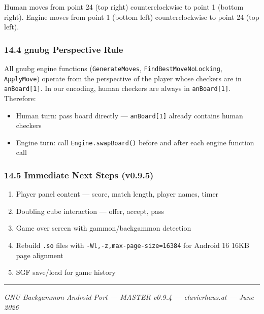 \documentclass[11pt,a4paper]{article}
\providecommand{\tightlist}{\setlength{\itemsep}{2pt}\setlength{\parskip}{0pt}}
\begin{document}
Human moves from point 24 (top right) counterclockwise to point 1
(bottom right). Engine moves from point 1 (bottom left) counterclockwise
to point 24 (top left).

\subsubsection{14.4 gnubg Perspective
Rule}\label{gnubg-perspective-v094}

All gnubg engine functions (\texttt{GenerateMoves},
\texttt{FindBestMoveNoLocking}, \texttt{ApplyMove}) operate from the
perspective of the player whose checkers are in \texttt{anBoard[1]}.
In our encoding, human checkers are always in \texttt{anBoard[1]}.
Therefore:

\begin{itemize}
\tightlist
\item
  Human turn: pass board directly — \texttt{anBoard[1]} already contains
  human checkers
\item
  Engine turn: call \texttt{Engine.swapBoard()} before and after each
  engine function call
\end{itemize}

\subsubsection{14.5 Immediate Next Steps
(v0.9.5)}\label{immediate-next-steps-v095}

\begin{enumerate}
\def\labelenumi{\arabic{enumi}.}
\tightlist
\item
  Player panel content — score, match length, player names, timer
\item
  Doubling cube interaction — offer, accept, pass
\item
  Game over screen with gammon/backgammon detection
\item
  Rebuild \texttt{.so} files with \texttt{-Wl,-z,max-page-size=16384}
  for Android 16 16KB page alignment
\item
  SGF save/load for game history
\end{enumerate}

\begin{center}\rule{0.5\linewidth}{0.5pt}\end{center}

\emph{GNU Backgammon Android Port --- MASTER v0.9.4 --- clavierhaus.at
--- June 2026}
\end{document}
